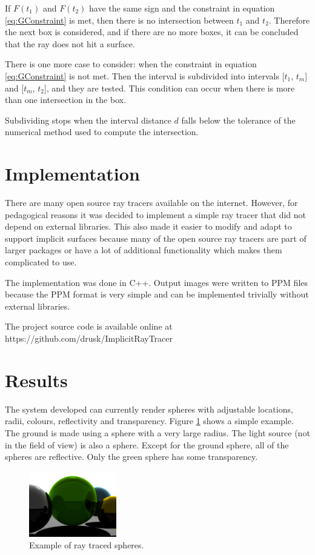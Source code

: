 \documentclass[conference]{acmsiggraph}
\begin{document}
If $F(t_1)$ and $F(t_2)$ have the same sign and the constraint in
equation \ref{eq:GConstraint} is met, then there is no intersection
between $t_1$ and $t_2$.  Therefore the next box is considered,
and if there are no more boxes, it can be concluded that the ray
does not hit a surface.

There is one more case to consider: when the constraint in equation
\ref{eq:GConstraint} is not met.  Then the interval is subdivided into
intervals [$t_1$, $t_m$] and [$t_m$, $t_2$], and they are tested.
This condition can occur when there is more than one intersection
in the box.

Subdividing stops when the interval distance $d$ falls below the
tolerance of the numerical method used to compute the intersection.

\section{Implementation}

There are many open source ray tracers available on the internet.  However, 
for pedagogical reasons it was decided to implement a simple ray tracer that
did not depend on external libraries.  
This also made it easier to modify and adapt to support implicit
surfaces because many of the open source ray tracers are part of larger 
packages or have a lot of additional functionality which makes them 
complicated to use.

The implementation was done in C++.  Output 
images were written to PPM files because the PPM format is 
very simple and can be implemented trivially without external libraries.

The project source code is available online at 
https://github.com/drusk/ImplicitRayTracer

\section{Results}

The system developed can currently render spheres with adjustable locations,
radii, colours, reflectivity and transparency.  Figure \ref{fig:spheres} shows a
simple example.  The ground is made using a sphere with a very large radius.
The light source (not in the field of view) is also a sphere.  Except for the
ground sphere, all of the spheres are reflective.  Only the green sphere has some
transparency.

\begin{figure}[ht]
  \centering
  \includegraphics[width=1.5in]{figures/spheres.png}
  \caption{Example of ray traced spheres.}
  \label{fig:spheres}
\end{figure}
\end{document}
